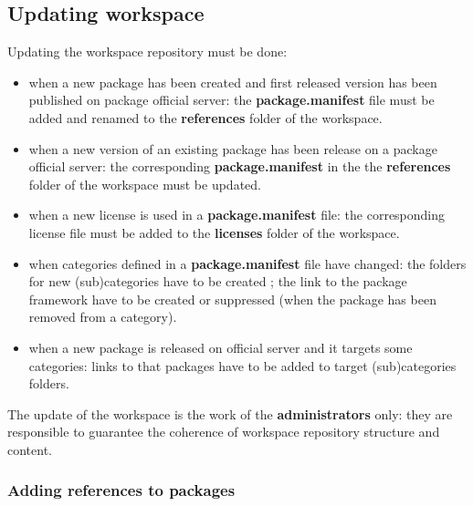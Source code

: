 \documentclass[12pt,a4paper]{article}
\begin{document}
\subsection{Updating workspace}

Updating the workspace repository must be done:
\begin{itemize}
\item when a new package has been created and first released version has been published on package official server: the \textbf{package.manifest} file must be added  and renamed to the \textbf{references} folder of the workspace.
\item when a new version of an existing package has been release on a package official server: the corresponding \textbf{package.manifest} in the the \textbf{references} folder of the workspace must be updated.
\item when a new license is used in a \textbf{package.manifest} file: the corresponding license file must be added to the \textbf{licenses} folder of the workspace.
\item when categories defined in a \textbf{package.manifest} file have changed: the folders for new (sub)categories have to be created ; the link to the package framework have to be created or suppressed (when the package has been removed from a category).
\item when a new package is released on official server and it targets some categories: links to that packages have to be added to target (sub)categories folders.
\end{itemize}
 
The update of the workspace is the work of the \textbf{administrators} only: they are responsible to guarantee the coherence of workspace repository structure and content.

\subsubsection{Adding references to packages}
\end{document}
